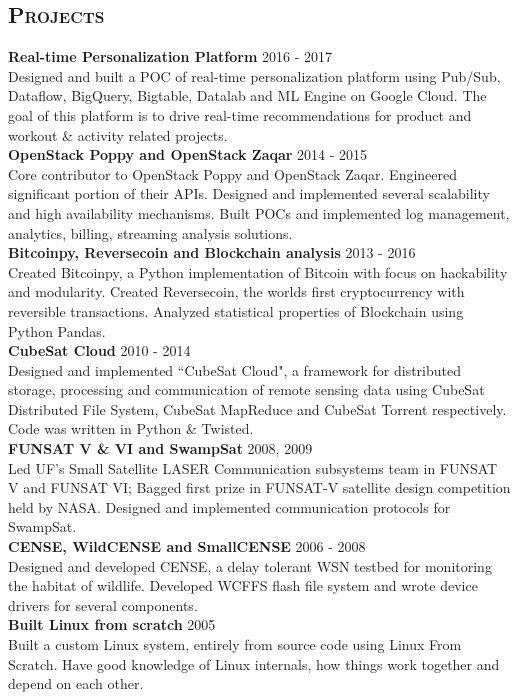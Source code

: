 \begin{resume}
\section{\textsc{Projects}}
\textbf{Real-time Personalization Platform} \hfill 2016 - 2017\\
Designed and built a POC of real-time personalization platform using Pub/Sub, Dataflow, BigQuery, Bigtable, Datalab and ML Engine on Google Cloud. The goal of this platform is to drive real-time recommendations for product and workout \& activity related projects.\\
\textbf{OpenStack Poppy and OpenStack Zaqar} \hfill 2014 - 2015\\
Core contributor to OpenStack Poppy and OpenStack Zaqar. Engineered significant portion of their APIs. Designed and implemented several scalability and high availability mechanisms. Built POCs and implemented log management, analytics, billing, streaming analysis solutions.\\
\textbf{Bitcoinpy, Reversecoin and Blockchain analysis} \hfill 2013 - 2016\\
Created Bitcoinpy, a Python implementation of Bitcoin with focus on hackability and modularity. Created Reversecoin, the worlds first cryptocurrency with reversible transactions. Analyzed statistical properties of Blockchain using Python Pandas.\\
\textbf{CubeSat Cloud} \hfill 2010 - 2014 \\
Designed and implemented ``CubeSat Cloud", a framework for distributed storage, processing and communication of remote sensing data using CubeSat Distributed File System, CubeSat MapReduce and CubeSat Torrent respectively. Code was written in Python \& Twisted.\\
\textbf{FUNSAT V \& VI and SwampSat} \hfill 2008, 2009 \\
Led UF's Small Satellite LASER Communication subsystems team in FUNSAT V and FUNSAT VI; Bagged first prize in FUNSAT-V satellite design competition held by NASA. Designed and implemented communication protocols for SwampSat.\\
\textbf{CENSE, WildCENSE and SmallCENSE} \hfill 2006 - 2008\\
Designed and developed CENSE, a delay tolerant WSN testbed for monitoring the habitat of wildlife. Developed WCFFS flash file system and wrote device drivers for several components.\\
\textbf{Built Linux from scratch} \hfill 2005 \\
Built a custom Linux system, entirely from source code using Linux From Scratch. Have good knowledge of Linux internals, how things work together and depend on each other.


\end{resume}
